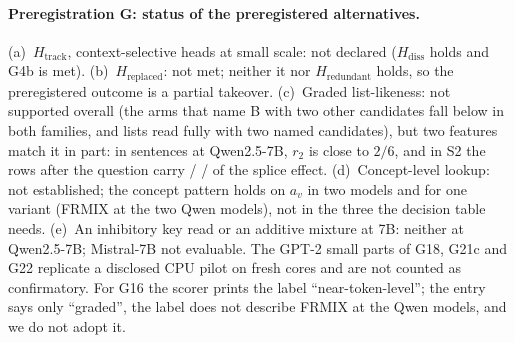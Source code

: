 \begin{table}[p]
\centering
\footnotesize
\caption{\textbf{Preregistration G.} GPU stage 5, scored by \texttt{analysis/stage5\_score.py}. Predictions, scoring script and code were finalised together before any stage-5 GPU run; a first attempt stopped in the unit tests before any model was loaded, and the entry was re-finalised with test-only changes at \texttt{51e105e}, the commit the run used. Parts (a)--(d): the 150 seed-0 story cores of stages 1 and 3b (the row splice and the form probe on the first 60); part (e): 200 fresh IOI cores. Triples are Qwen2.5-7B / Qwen2.5-14B / Mistral-7B (Instruct) unless the row says otherwise; G2 and G3 concern Qwen2.5-1.5B and 3B; part (d) adds OLMo-2-7B and is met if at least three evaluable models meet it. A prediction with sub-verdicts is not met unless every sub-verdict is met (the scorer's rule); the Observed column gives the sub-verdicts. 95\% core-bootstrap CIs. In all, \GcountMet{} met and \GcountNotMet{} not met; none was not evaluable. Details in \cref{app:stage5}.}
\label{tab:prereg-g}
{\scriptsize}
\end{table}

\paragraph{Preregistration G: status of the preregistered alternatives.} (a)~$H_{\mathrm{track}}$, context-selective heads at small scale: not declared ($H_{\mathrm{diss}}$ holds and G4b is met). (b)~$H_{\mathrm{replaced}}$: not met; neither it nor $H_{\mathrm{redundant}}$ holds, so the preregistered outcome is a partial takeover. (c)~Graded list-likeness: not supported overall (the arms that name B with two other candidates fall below \fmtNone{} in both families, and lists read fully with two named candidates), but two features match it in part: in sentences at Qwen2.5-7B, $r_2$ is close to $2/6$, and in S2 the rows after the question carry \GtwelveRestStwoQwenSeven{} / \GtwelveRestStwoQwenFourteen{} / \GtwelveRestStwoMistralSeven{} of the splice effect. (d)~Concept-level lookup: not established; the concept pattern holds on $a_v$ in two models and for one variant (FRMIX at the two Qwen models), not in the three the decision table needs. (e)~An inhibitory key read or an additive mixture at 7B: neither at Qwen2.5-7B; Mistral-7B not evaluable. The GPT-2 small parts of G18, G21c and G22 replicate a disclosed CPU pilot on fresh cores and are not counted as confirmatory. For G16 the scorer prints the label ``near-token-level''; the entry says only ``graded'', the label does not describe FRMIX at the Qwen models, and we do not adopt it.


